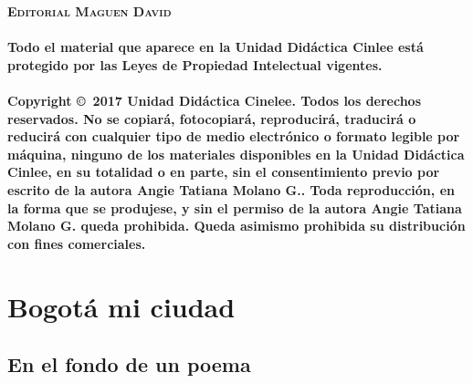 \documentclass[11pt,fleqn,twocolumn]{book} %
\begin{document}
\noindent \textsc{\textbf{Editorial Maguen David}}\\\\
\noindent \textbf{\small{Todo el material que aparece en la Unidad Didáctica Cinlee está protegido por las Leyes de Propiedad Intelectual vigentes.}}\\\\
\noindent\small{ \textbf{Copyright \copyright\ 2017 Unidad Didáctica Cinelee. Todos los derechos reservados. No se copiará, fotocopiará, reproducirá, traducirá o reducirá con cualquier tipo de medio electrónico o formato legible por máquina, ninguno de los materiales disponibles en la Unidad Didáctica Cinlee, en su totalidad o en parte, sin el consentimiento previo por escrito de la autora Angie Tatiana Molano G.. Toda reproducción, en la forma que se produjese, y sin el permiso de la autora Angie Tatiana Molano G. queda prohibida. Queda asimismo prohibida su distribución con fines comerciales.}}
\large

\pagestyle{empty} %

\renewcommand\contentsname{Tabla de Contenido}
\renewcommand{\bibname}{Bibliographie}
\tableofcontents%


\pagestyle{fancy} %

\twocolumn
{} %

\chapter{Bogotá mi ciudad}

\section{En el fondo de un poema}

\vspace{2em}
\end{document}

